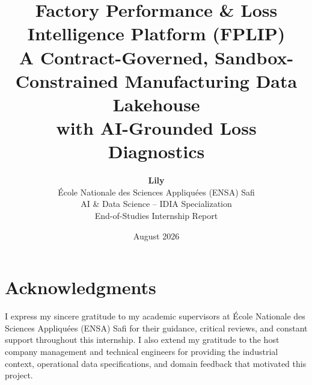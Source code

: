 \documentclass[12pt, a4paper]{report}
\title{
    \Large \textbf{\color{primary}Factory Performance \& Loss Intelligence Platform (FPLIP)} \\
    \vspace{0.3cm}
    \large \color{secondary}A Contract-Governed, Sandbox-Constrained Manufacturing Data Lakehouse \\
    \vspace{0.2cm}
    \normalsize \color{darkgray}with AI-Grounded Loss Diagnostics
}
\author{
    \textbf{Lily} \\
    \'Ecole Nationale des Sciences Appliqu\'ees (ENSA) Safi \\
    AI \& Data Science -- IDIA Specialization \\
    End-of-Studies Internship Report
}
\date{August 2026}
\begin{document}
\maketitle


\chapter*{Acknowledgments}
I express my sincere gratitude to my academic supervisors at \'Ecole Nationale des Sciences Appliqu\'ees (ENSA) Safi for their guidance, critical reviews, and constant support throughout this internship. I also extend my gratitude to the host company management and technical engineers for providing the industrial context, operational data specifications, and domain feedback that motivated this project.
\end{document}
